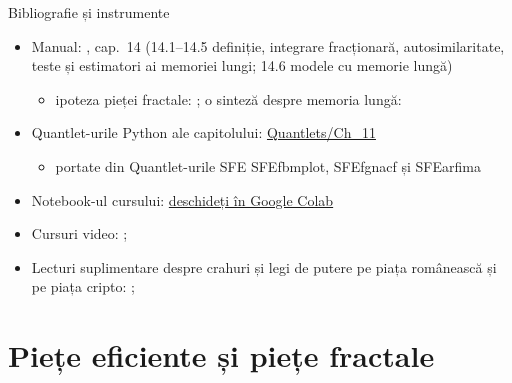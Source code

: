\begin{frame}{Bibliografie și instrumente}
\itemsize{\small}
\begin{itemize}
    \item Manual: , cap.~14 (14.1--14.5 definiție, integrare fracționară, autosimilaritate, teste și estimatori ai memoriei lungi; 14.6 modele cu memorie lungă)
    \begin{itemize}
        \item ipoteza pieței fractale: ; o sinteză despre memoria lungă: 
    \end{itemize}
    \item Quantlet-urile Python ale capitolului: \href{https://github.com/danpele/SFM/tree/main/Quantlets/Ch_11}{Quantlets/Ch\_11}
    \begin{itemize}
        \item portate din Quantlet-urile SFE SFEfbmplot, SFEfgnacf și SFEarfima
    \end{itemize}
    \item Notebook-ul cursului: \href{\colaburl{notebooks/EN/chapter11_lecture_notebook.ipynb}}{deschideți în Google Colab}
    \item Cursuri video: ; 
    \item Lecturi suplimentare despre crahuri și legi de putere pe piața românească și pe piața cripto: ; 
\end{itemize}
\end{frame}


\section{Piețe eficiente și piețe fractale}


